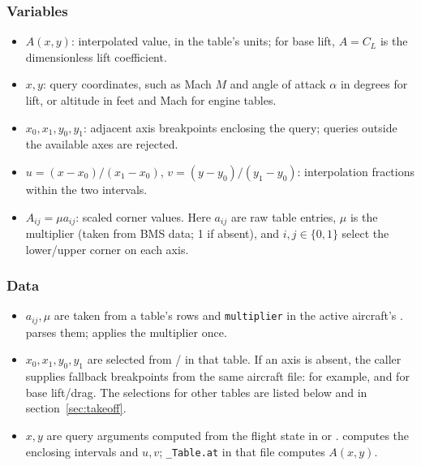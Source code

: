 \documentclass[10pt,a4paper]{amsart}
\begin{document}
\subsubsection*{Variables}
\begin{itemize}
\setlength{\itemsep}{0pt}
\setlength{\parsep}{0pt}
\item $A(x,y)$: interpolated value, in the table's units; for base lift,
$A=C_L$ is the dimensionless lift coefficient.
\item $x,y$: query coordinates, such as Mach $M$ and angle of attack
$\alpha$ in degrees for lift, or altitude in feet and Mach for engine tables.
\item $x_0,x_1,y_0,y_1$: adjacent axis breakpoints enclosing the query;
queries outside the available axes are rejected.
\item $u=(x-x_0)/(x_1-x_0)$, $v=(y-y_0)/(y_1-y_0)$: interpolation
fractions within the two intervals.
\item $A_{ij}=\mu a_{ij}$: scaled corner values. Here $a_{ij}$ are raw
table entries, $\mu$ is the multiplier (taken from BMS data; 1 if absent), and
$i,j\in\{0,1\}$ select the lower/upper corner on each axis.
\end{itemize}

\subsubsection*{Data}
\begin{itemize}
\setlength{\itemsep}{0pt}
\setlength{\parsep}{0pt}
\item $a_{ij},\mu$ are taken from a table's  rows and
\texttt{multiplier} in the active aircraft's .
 parses them;
 applies the multiplier once.
\item $x_0,x_1,y_0,y_1$ are selected from
/ in that table.
If an axis is absent, the caller supplies fallback breakpoints from
the same aircraft file: for example, 
and  for base lift/drag.
The selections for other tables are listed below and in
section~\ref{sec:takeoff}.
\item $x,y$ are query arguments computed from the flight state in
 or .
 computes the enclosing intervals and
$u,v$; \texttt{\_Table.at} in that file computes $A(x,y)$.
\end{itemize}
\end{document}

